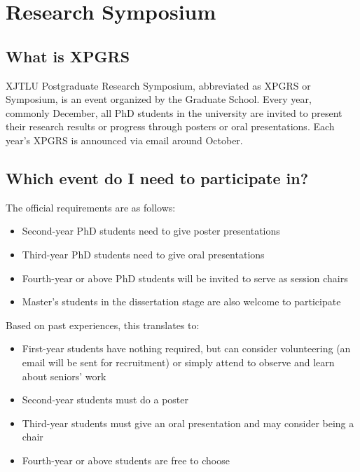 \section{Research Symposium}

\subsection{What is XPGRS}
XJTLU Postgraduate Research Symposium, abbreviated as XPGRS or Symposium, is an event organized by the Graduate School. Every year, commonly December, all PhD students in the university are invited to present their research results or progress through posters or oral presentations. Each year's XPGRS is announced via email around October.

\subsection{Which event do I need to participate in?}

The official requirements are as follows:

\begin{itemize}
    \item Second-year PhD students need to give poster presentations
    \item Third-year PhD students need to give oral presentations
    \item Fourth-year or above PhD students will be invited to serve as session chairs
    \item Master's students in the dissertation stage are also welcome to participate
\end{itemize}

Based on past experiences, this translates to:

\begin{itemize}
    \item First-year students have nothing required, but can consider volunteering (an email will be sent for recruitment) or simply attend to observe and learn about seniors' work
    \item Second-year students must do a poster
    \item Third-year students must give an oral presentation and may consider being a chair
    \item Fourth-year or above students are free to choose
\end{itemize}

